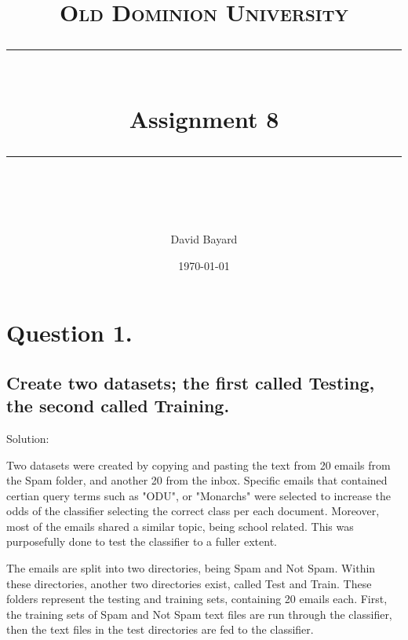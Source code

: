 \documentclass[11pt]{scrartcl} %
\title{
	\normalfont\normalsize
	\textsc{Old Dominion University}\\ %
	\vspace{25pt} %
	\rule{\linewidth}{0.5pt}\\ %
	\vspace{20pt} %
	{\huge Assignment 8}\\ %
	\vspace{12pt} %
	\rule{\linewidth}{2pt}\\ %
	\vspace{12pt} %
}
\author{\LARGE David Bayard} %
\date{\normalsize\today} %
\begin{document}

\lstset{style=pythonStyle}


\maketitle %

\pagebreak
\section*{Question 1.}




\subsection*{Create two datasets; the first called Testing, the second called Training.}
\bigskip\bigskip


\large Solution:
\newline \small

\tabto{2.0cm} Two datasets were created by copying and pasting the text from 20 emails from the Spam folder, and another 20 from the inbox. Specific emails that contained certian query terms such as "ODU", or "Monarchs" were selected to increase
the odds of the classifier selecting the correct class per each document. Moreover, most of the emails shared a similar topic, being school related. This was purposefully done to test the classifier to a fuller extent.
\newline \newline

\tabto{2.0cm} The emails are split into two directories, being Spam and Not Spam. Within these directories, another two directories exist, called Test and Train. These folders represent the testing and training sets, containing 20 emails each. First, the training sets of Spam and Not Spam text files are run through the classifier, then the text files in the test directories are fed to the classifier. \newline
\end{document}
